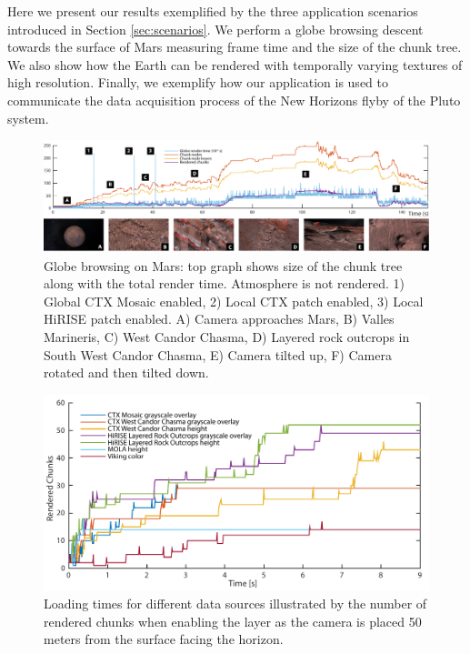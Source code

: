 \documentclass[journal]{vgtc}                %
\begin{document}
Here we present our results exemplified by the three application scenarios introduced in Section \ref{sec:scenarios}. We perform a globe browsing descent towards the surface of Mars measuring frame time and the size of the chunk tree. We also show how the Earth can be rendered with temporally varying textures of high resolution. Finally, we exemplify how our application is used to communicate the data acquisition process of the New Horizons flyby of the Pluto system.

\begin{figure}
\includegraphics[width=\linewidth]{figures/marsbrowsing5_compressed.pdf}
\caption{Globe browsing on Mars: top graph shows size of the chunk tree along with the total render time. Atmosphere is not rendered. 1) Global CTX Mosaic enabled, 2) Local CTX patch enabled, 3) Local HiRISE patch enabled. A) Camera approaches Mars, B) Valles Marineris, C) West Candor Chasma, D) Layered rock outcrops in South West Candor Chasma, E) Camera tilted up, F) Camera rotated and then tilted down.}  \vspace{-4mm}
\label{fig:globebrowsingmars}
\end{figure}

\begin{figure}[t!]
  \centering
    \includegraphics[width=1.0\linewidth]{figures/load_times.pdf}
  \caption{Loading times for different data sources illustrated by the number of rendered chunks when enabling the layer as the camera is placed 50\,meters from the surface facing the horizon.}
  \label{fig:load-times}\vspace*{-4mm}
\end{figure}
\end{document}
